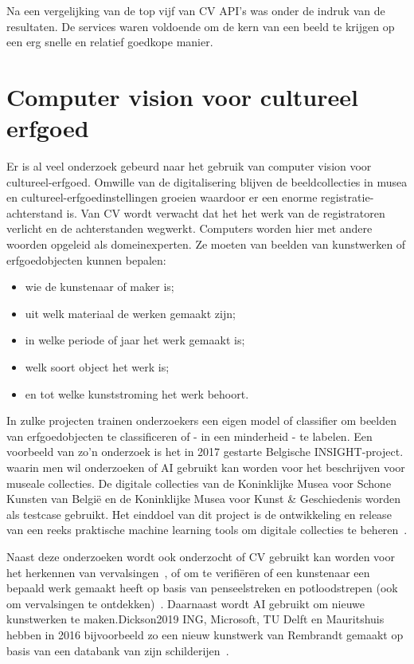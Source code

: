 Na een vergelijking van de top vijf van CV API’s was \textcite{Oberoi2016} onder de indruk van de resultaten. De services waren voldoende om de kern van een beeld te krijgen op een erg snelle en relatief goedkope manier.

\section{Computer vision voor cultureel erfgoed}
\label{sec:cv-voor-ce}

Er is al veel onderzoek gebeurd naar het gebruik van computer vision voor cultureel-erfgoed. Omwille van de digitalisering blijven de beeldcollecties in musea en cultureel-erfgoedinstellingen groeien waardoor er een enorme registratie-achterstand is.  Van CV wordt verwacht dat het het werk van de registratoren verlicht en de achterstanden wegwerkt. Computers worden hier met andere woorden opgeleid als domeinexperten. Ze moeten van beelden van kunstwerken of erfgoedobjecten kunnen bepalen:
\begin{itemize}
	\item wie de kunstenaar of maker is;
	\item uit welk materiaal de werken gemaakt zijn; 
	\item in welke periode of jaar het werk gemaakt is;
	\item welk soort object het werk is;
	\item en tot welke kunststroming het werk behoort.  
\end{itemize}


In zulke projecten trainen onderzoekers een eigen model of classifier om beelden van erfgoedobjecten te classificeren of - in een minderheid - te labelen. Een voorbeeld van zo’n onderzoek is het in 2017 gestarte Belgische INSIGHT-project. waarin men wil onderzoeken of AI gebruikt kan worden voor het beschrijven voor museale collecties. De digitale collecties van de Koninklijke Musea voor Schone Kunsten van Belgi\"{e} en de Koninklijke Musea voor Kunst \& Geschiedenis worden als testcase gebruikt. Het einddoel van dit project is de ontwikkeling en release van een reeks praktische machine learning tools om digitale collecties te beheren~\autocite{UniAntwerpen2017?}.

Naast deze onderzoeken wordt ook onderzocht of CV gebruikt kan worden voor het herkennen van vervalsingen~\autocite{Dickson2018}, of om te verifi\"{e}ren of een kunstenaar een bepaald werk gemaakt heeft op basis van penseelstreken en potloodstrepen (ook om vervalsingen te ontdekken)~\autocite{Elgammal2017}. Daarnaast wordt AI gebruikt om nieuwe kunstwerken te maken.{Dickson2019} ING, Microsoft, TU Delft en Mauritshuis hebben in 2016 bijvoorbeeld zo een nieuw kunstwerk van Rembrandt gemaakt op basis van een databank van zijn schilderijen~\autocite{ING2016}.%


